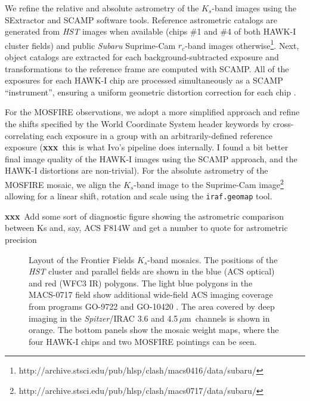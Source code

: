 \documentclass[iop, numberedappendix]{emulateapj}
\gdef\mum{$\mu\mathrm{m}$}
\gdef\xxx{\textbf{xxx}}
\begin{document}
We refine the relative and absolute astrometry of the $K_s$-band images using the SExtractor \citep{bertin:96} and SCAMP \citep{scamp} software tools. Reference astrometric catalogs are generated from \textit{HST} images when available (chips \#1 and \#4 of both HAWK-I cluster fields) and public \textit{Subaru} Suprime-Cam $r_c$-band images otherwise\footnote{http://archive.stsci.edu/pub/hlsp/clash/macs0416/data/subaru/}.  Next, object catalogs are extracted for each background-subtracted exposure and transformations to the reference frame are computed with SCAMP.  All of the exposures for each HAWK-I chip are processed simultaneously as a SCAMP ``instrument'', ensuring a uniform geometric distortion correction for each chip \citep[see also][for a detailed discussion of the HAWK-I geometric distortion]{libralato:14}.

For the MOSFIRE observations, we adopt a more simplified approach and refine the shifts specified by the World Coordinate System header keywords by cross-correlating each exposure in a group with an arbitrarily-defined reference exposure (\xxx\ this is what Ivo's pipeline does internally.  I found a bit better final image quality of the HAWK-I images using the SCAMP approach, and the HAWK-I distortions are non-trivial).  For the absolute astrometry of the MOSFIRE mosaic, we align the $K_s$-band image to the Suprime-Cam image\footnote{http://archive.stsci.edu/pub/hlsp/clash/macs0717/data/subaru/} allowing for a linear shift, rotation and scale using the \texttt{iraf.geomap} tool.

\xxx\ Add some sort of diagnostic figure showing the astrometric comparison between Ks and, say, ACS F814W and get a number to quote for astrometric precision

\begin{figure*}
\caption{Layout of the Frontier Fields $K_s$-band mosaics.  The positions of the \textit{HST} cluster and parallel fields are shown in the blue (ACS optical) and red (WFC3 IR) polygons.  The light blue polygons in the MACS-0717 field show additional wide-field ACS imaging coverage from  programs GO-9722 and GO-10420 \citep[PI: Ebeling;][]{ma:11}.  The area covered by deep imaging in the \textit{Spitzer}/IRAC 3.6 and 4.5\,\mum\ channels is shown in orange.  The bottom panels show the mosaic weight maps, where the four HAWK-I chips and two MOSFIRE pointings can be seen.\label{fig:layout}}  
\end{figure*}
\end{document}
